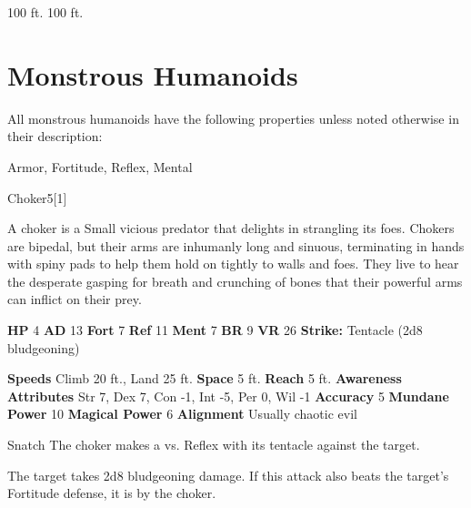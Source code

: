       
       100 ft.
     100 ft.
  
        \newpage
        \section{Monstrous Humanoids}

        All monstrous humanoids have the following properties unless noted otherwise in their description:
        
    
     Armor,
     Fortitude,
     Reflex,
     Mental
  
  
      
  \begin{monsection}{Choker}{5}[1]
    \vspace{-1em}\vspace{-1em}
    \vspace{0em}

    
        A choker is a Small vicious predator that delights in strangling its foes.
        Chokers are bipedal, but their arms are inhumanly long and sinuous, terminating in hands with spiny pads to help them hold on tightly to walls and foes.
        They live to hear the desperate gasping for breath and crunching of bones that their powerful arms can inflict on their prey.
      

    \begin{spellcontent}
      \begin{spelltargetinginfo}
        \pari \textbf{HP} 4 \monsep
          \textbf{AD} 13 \monsep
          \textbf{Fort} 7 \monsep
          \textbf{Ref} 11 \monsep
          \textbf{Ment} 7
        \pari \textbf{BR} 9 \monsep
        \textbf{VR} 26
        \pari \textbf{Strike:}
            Tentacle  (2d8 bludgeoning)
      \end{spelltargetinginfo}
    \end{spellcontent}
    \begin{monsterfooter}
      \pari \textbf{Speeds} Climb 20 ft., Land 25 ft. \monsep
        \textbf{Space} 5 ft. \monsep
        \textbf{Reach} 5 ft.
      \pari \textbf{Awareness} 
      \pari \textbf{Attributes}
        Str 7, Dex 7,
        Con -1, Int -5,
        Per 0, Wil -1
      \pari \textbf{Accuracy} 5 \monsep
        \textbf{Mundane Power} 10 \monsep
      \textbf{Magical Power} 6
      \pari \textbf{Alignment} Usually chaotic evil
    \end{monsterfooter}
  \end{monsection}
  \begin{freeability}{Snatch}
       The choker makes a 
         vs. Reflex
        with its tentacle against the target.
    
    \hit 
          The target takes 2d8 bludgeoning damage.
          If this attack also beats the target's Fortitude defense, it is  by the choker.
    \end{freeability}
  

